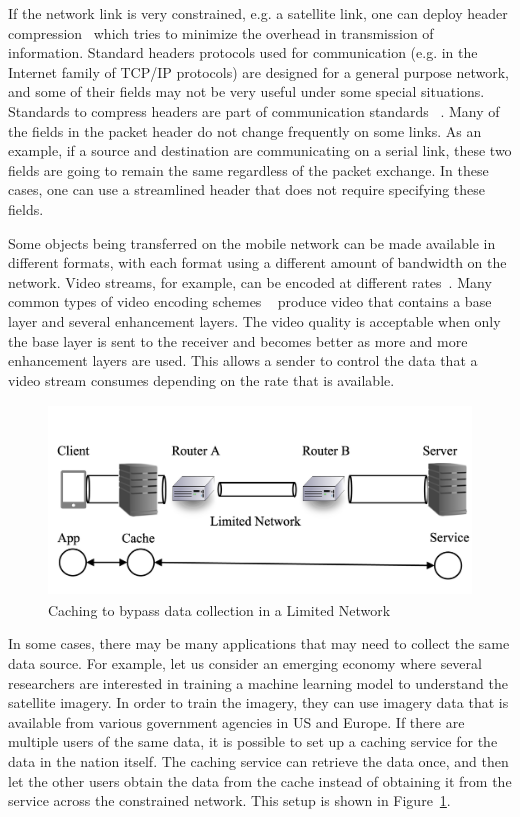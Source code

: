 If the network link is very constrained, e.g. a satellite link, one can deploy header compression~\cite{tye2003review} which tries to minimize the overhead in transmission of information. Standard headers protocols used for communication (e.g. in the Internet family of TCP/IP protocols) are designed for a general purpose network, and some of their fields may not be very useful under some special situations. Standards to compress headers are part of communication standards ~\cite{rfc1144, rfc2507, rfc3544}. Many of the fields in the packet header do not change frequently on some links. As an example, if a source and destination are communicating on a serial link, these two fields are going to remain the same regardless of the packet exchange. In these cases, one can use a streamlined header that does not require specifying these fields.

Some objects being transferred on the mobile network can be made available in different formats, with each format using a different amount of bandwidth on the network. Video streams, for example, can be encoded at different rates~\cite{pancha1994mpeg}. Many common types of video encoding schemes ~\cite{li2001overview} produce video that contains a base layer and several enhancement layers. The video quality is acceptable when only the base layer is sent to the receiver and becomes better as more and more enhancement layers are used. This allows a sender to control the data that a video stream consumes depending on the rate that is available.  


\begin{figure}[htbp]
\centering
\includegraphics[height=2in] {chapters/chap_net_limited/chap_net_figures/fig3.png}
\caption{Caching to bypass data collection in a Limited Network}
\label{fig:chap_net:cache}
\end{figure}

In some cases, there may be many applications that may need to collect the same data source. For example, let us consider an emerging economy where several researchers are interested in training a machine learning model to understand the satellite imagery. In order to train the imagery, they can use imagery data that is available from various government agencies in US and Europe. If there are multiple users of the same data, it is possible to set up a caching service for the data in the nation itself. The caching service can retrieve the data once, and then let the other users obtain the data from the cache instead of obtaining it from the service across the constrained network. This setup is shown in Figure~\ref{fig:chap_net:cache}. 


